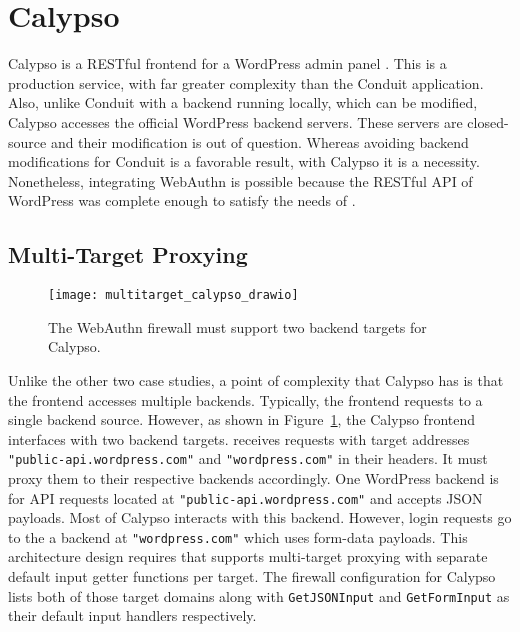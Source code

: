 
\section{Calypso}

Calypso is a RESTful frontend for a WordPress admin panel \cite{calypso}. This is a production service, with far greater complexity than the Conduit application. Also, unlike Conduit with a backend running locally, which can be modified, Calypso accesses the official WordPress backend servers. These servers are closed-source and their modification is out of question. Whereas avoiding backend modifications for Conduit is a favorable result, with Calypso it is a necessity. Nonetheless, integrating WebAuthn is possible because the RESTful API of WordPress was complete enough to satisfy the needs of \sys{}.

\subsection{Multi-Target Proxying}

\begin{figure}[h]
  \centering
  \texttt{[image: multitarget\_calypso\_drawio]}
  \caption{The WebAuthn firewall must support two backend targets for Calypso.}
  \label{Fig:MultiTargetCalypso}
\end{figure}


Unlike the other two case studies, a point of complexity that Calypso has is that the frontend accesses multiple backends. Typically, the frontend requests to a single backend source. However, as shown in Figure~\ref{Fig:MultiTargetCalypso}, the Calypso frontend interfaces with two backend targets. \sys{} receives requests with target addresses \lstinline{"public-api.wordpress.com"} and \lstinline{"wordpress.com"} in their headers. It must proxy them to their respective backends accordingly. One WordPress backend is for API requests located at \lstinline{"public-api.wordpress.com"} and accepts JSON payloads. Most of Calypso interacts with this backend. However, login requests go to the a backend at \lstinline{"wordpress.com"} which uses form-data payloads. This architecture design requires that \sys{} supports multi-target proxying with separate default input getter functions per target. The firewall configuration for Calypso lists both of those target domains along with \lstinline{GetJSONInput} and \lstinline{GetFormInput} as their default input handlers respectively. 

